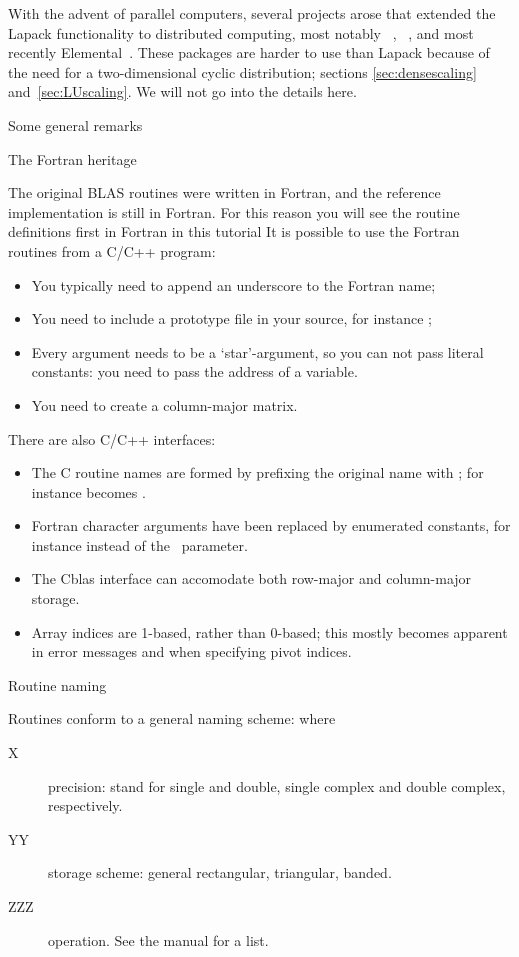 With the advent of parallel computers, several projects arose that
extended the Lapack functionality to distributed computing, most
notably ~\cite{Choi:scalapack,scalapack-users-guide},
~\cite{PLAPACK,PLAPACK:UG},
and most recently Elemental~\cite{Elemental:TOMS}. These packages are
harder to use than Lapack because of the need for a
two-dimensional cyclic distribution; sections
\ref{sec:densescaling} and~\ref{sec:LUscaling}. We will not go into
the details here.

 {Some general remarks}

 {The Fortran heritage}

The original BLAS routines were written in Fortran, and the reference implementation
is still in Fortran. For this reason you will see the routine definitions first in Fortran
in this tutorial
It is possible to use the Fortran routines from a C/C++ program:
\begin{itemize}
\item You typically need to append an underscore to the Fortran name;
\item You need to include a prototype file in your source, for instance ;
\item Every argument needs to be a `star'-argument, so you can not pass literal constants:
  you need to pass the address of a variable.
\item You need to create a column-major matrix.
\end{itemize}
There are also C/C++ interfaces:
\begin{itemize}
\item The C routine names are formed by prefixing the original name with ;
  for instance  becomes .
\item Fortran character arguments have been replaced by enumerated constants,
  for instance  instead of the~ parameter.
\item The Cblas interface can accomodate both row-major and column-major storage.
\item Array indices are 1-based, rather than 0-based; this mostly
  becomes apparent in error messages and when specifying pivot
  indices.
\end{itemize}

 {Routine naming}

Routines conform to a general naming scheme:  where
\begin{description}
\item[X] precision:  stand for single and double, single
  complex and double complex, respectively.
\item[YY] storage scheme: general rectangular, triangular, banded.
\item[ZZZ] operation. See the manual for a list.
\end{description}

